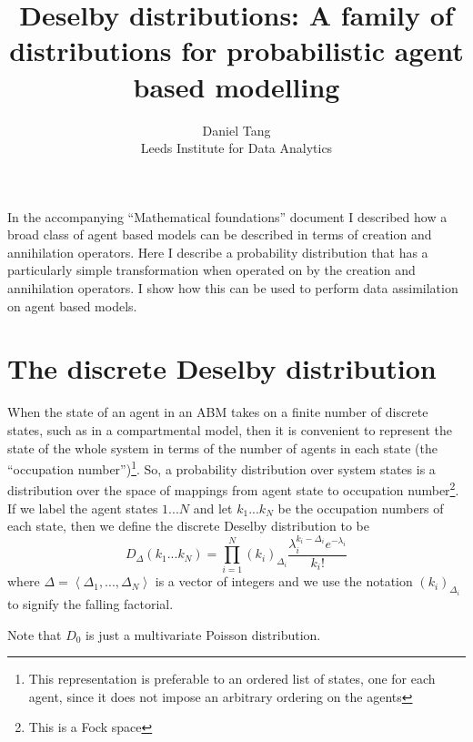 \documentclass[letterpaper,twocolumn,10pt]{article}
\begin{document}
\title{\Large \bf Deselby distributions: A family of distributions for probabilistic agent based modelling}

\author{
{\rm Daniel Tang}\\
Leeds Institute for Data Analytics
}

\maketitle


\abstract
In the accompanying ``Mathematical foundations'' document I described how a broad class of agent based models can be described in terms of creation and annihilation operators. Here I describe a probability distribution that has a particularly simple transformation when operated on by the creation and annihilation operators. I show how this can be used to perform data assimilation on agent based models.

\section{The discrete Deselby distribution}

When the state of an agent in an ABM takes on a finite number of discrete states, such as in a compartmental model, then it is convenient to represent the state of the whole system in terms of the number of agents in each state (the ``occupation number'')\footnote{This representation is preferable to an ordered list of states, one for each agent, since it does not impose an arbitrary ordering on the agents}. So, a probability distribution over system states is a distribution over the space of mappings from agent state to occupation number\footnote{This is a Fock space}. If we label the agent states $1...N$ and let $k_1...k_N$ be the occupation numbers of each state, then we define the discrete Deselby distribution to be
\begin{equation}
D_\Delta(k_1...k_N) = \prod_{i = 1}^N (k_i)_{\Delta_i} \frac{\lambda_i^{k_i-\Delta_i} e^{-\lambda_i}}{k_i!} 
\label{deselby}
\end{equation}
where $\Delta = \left<\Delta_1, ..., \Delta_N\right>$ is a vector of integers and we use the notation $(k_i)_{\Delta_i}$ to signify the falling factorial.

Note that $D_0$ is just a multivariate Poisson distribution.
\end{document}
